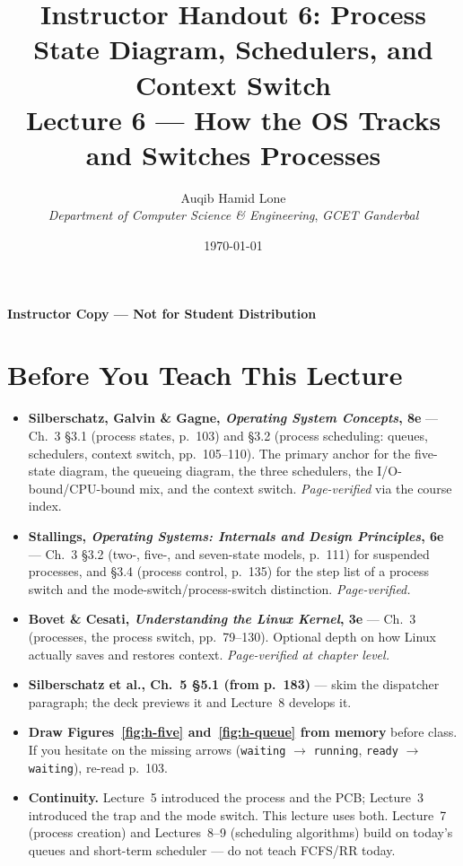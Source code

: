\documentclass[11pt]{article}
\title{Instructor Handout 6: Process State Diagram, Schedulers, and Context Switch\\[0.3em]
  \large Lecture 6 --- How the OS Tracks and Switches Processes}
\author{Auqib Hamid Lone\\[0.3em]
  \emph{Department of Computer Science \& Engineering}, \emph{GCET Ganderbal}}
\date{\today}
\begin{document}
\maketitle
{\centering\large\color{negative}\textbf{Instructor Copy --- Not for Student Distribution}\par}
\vspace{0.5cm}

\section{Before You Teach This Lecture}

\begin{itemize}
  \item \textbf{Silberschatz, Galvin \& Gagne, \textit{Operating System Concepts}, 8e} --- Ch.~3 \S3.1 (process states, p.~103) and \S3.2 (process scheduling: queues, schedulers, context switch, pp.~105--110). The primary anchor for the five-state diagram, the queueing diagram, the three schedulers, the I/O-bound/CPU-bound mix, and the context switch. \emph{Page-verified} via the course index.
  \item \textbf{Stallings, \textit{Operating Systems: Internals and Design Principles}, 6e} --- Ch.~3 \S3.2 (two-, five-, and seven-state models, p.~111) for suspended processes, and \S3.4 (process control, p.~135) for the step list of a process switch and the mode-switch/process-switch distinction. \emph{Page-verified.}
  \item \textbf{Bovet \& Cesati, \textit{Understanding the Linux Kernel}, 3e} --- Ch.~3 (processes, the process switch, pp.~79--130). Optional depth on how Linux actually saves and restores context. \emph{Page-verified at chapter level.}
  \item \textbf{Silberschatz et al., Ch.~5 \S5.1 (from p.~183)} --- skim the dispatcher paragraph; the deck previews it and Lecture~8 develops it.
  \item \textbf{Draw Figures~\ref{fig:h-five} and~\ref{fig:h-queue} from memory} before class. If you hesitate on the missing arrows (\texttt{waiting} $\to$ \texttt{running}, \texttt{ready} $\to$ \texttt{waiting}), re-read p.~103.
  \item \textbf{Continuity.} Lecture~5 introduced the process and the PCB; Lecture~3 introduced the trap and the mode switch. This lecture uses both. Lecture~7 (process creation) and Lectures~8--9 (scheduling algorithms) build on today's queues and short-term scheduler --- do not teach FCFS/RR today.
\end{itemize}
\end{document}
